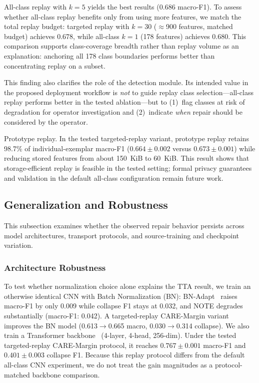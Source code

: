 \documentclass[preprint,12pt,authoryear]{elsarticle}
\let\cite\citep
\newcommand{\ours}{CARE}  %
\begin{document}
All-class replay with $k{=}5$ yields the best results (0.686 macro-F1).
To assess whether all-class replay benefits only from using more features, we match the total replay budget: targeted replay with $k{=}30$ (${\approx}$900 features, matched budget) achieves 0.678, while all-class $k{=}1$ (178 features) achieves 0.680.
This comparison supports class-coverage breadth rather than replay volume as an explanation: anchoring all 178 class boundaries performs better than concentrating replay on a subset.

This finding also clarifies the role of the detection module.
Its intended value in the proposed deployment workflow is \textit{not} to guide replay class selection---all-class replay performs better in the tested ablation---but to (1)~flag classes at risk of degradation for operator investigation and (2)~indicate \textit{when} repair should be considered by the operator.

Prototype replay.
\label{sec:proto_replay}
In the tested targeted-replay variant, prototype replay retains 98.7\% of individual-exemplar macro-F1 ($0.664{\pm}0.002$ versus $0.673{\pm}0.001$) while reducing stored features from about 150~KiB to 60~KiB. This result shows that storage-efficient replay is feasible in the tested setting; formal privacy guarantees and validation in the default all-class configuration remain future work.

\subsection{Generalization and Robustness}
\label{sec:generalization_robustness}

This subsection examines whether the observed repair behavior persists across model architectures, transport protocols, and source-training and checkpoint variation.

\subsubsection{Architecture Robustness}
\label{sec:robustness}

\label{sec:bn_verify}
\label{sec:transformer}
To test whether normalization choice alone explains the TTA result, we train an otherwise identical CNN with Batch Normalization (BN): BN-Adapt~\cite{schneider2020bn} raises macro-F1 by only 0.009 while collapse F1 stays at 0.032, and NOTE degrades substantially (macro-F1: 0.042). A targeted-replay \ours{}-Margin variant improves the BN model (0.613$\to$0.665 macro, 0.030$\to$0.314 collapse).
We also train a Transformer backbone~\cite{vaswani2017attention} (4-layer, 4-head, 256-dim). Under the tested targeted-replay \ours{}-Margin protocol, it reaches $0.767{\pm}0.001$ macro-F1 and $0.401{\pm}0.003$ collapse F1. Because this replay protocol differs from the default all-class CNN experiment, we do not treat the gain magnitudes as a protocol-matched backbone comparison.
\end{document}
